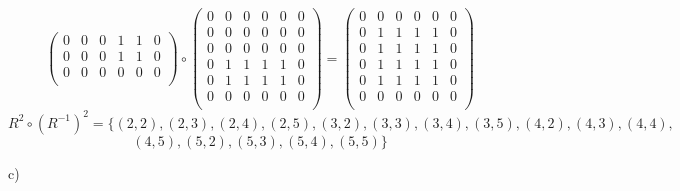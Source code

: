 \documentclass[12pt]{article}
\begin{document}
\begin{enumerate}
\begin{equation*}
\begin{pmatrix}
					0 & 0 & 0 & 1 & 1 & 0\\
					0 & 0 & 0 & 1 & 1 & 0\\
					0 & 0 & 0 & 0 & 0 & 0\\
				\end{pmatrix} \circ
				\begin{pmatrix} 
					0 & 0 & 0 & 0 & 0 & 0\\ 
					0 & 0 & 0 & 0 & 0 & 0\\
					0 & 0 & 0 & 0 & 0 & 0\\
					0 & 1 & 1 & 1 & 1 & 0\\
					0 & 1 & 1 & 1 & 1 & 0\\
					0 & 0 & 0 & 0 & 0 & 0\\
				\end{pmatrix} =
				\begin{pmatrix} 
					0 & 0 & 0 & 0 & 0 & 0\\ 
					0 & 1 & 1 & 1 & 1 & 0\\
					0 & 1 & 1 & 1 & 1 & 0\\
					0 & 1 & 1 & 1 & 1 & 0\\
					0 & 1 & 1 & 1 & 1 & 0\\
					0 & 0 & 0 & 0 & 0 & 0\\
				\end{pmatrix}
			\end{equation*}
			$$R^2 \circ (R^{-1})^2 = \{(2, 2), (2, 3), (2, 4)
			, (2, 5), (3, 2), (3, 3), (3, 4), (3, 5), (4, 2), 
			(4, 3), (4, 4),$$
			$$ (4, 5), (5, 2), (5, 3), (5, 4), (5, 5)\}$$

		 c)
		 

\end{enumerate}
\end{document}

